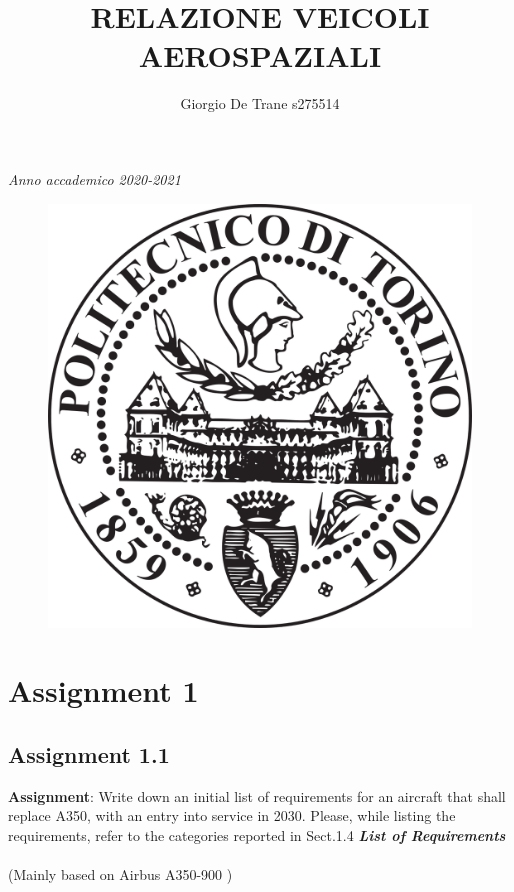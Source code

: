 \documentclass{article}
\author{Giorgio De Trane s275514}
\title{\textbf{RELAZIONE VEICOLI AEROSPAZIALI}}
\begin{document}
\setlength{\parindent}{0pt}
\maketitle
\begin{center}
    \textit{Anno accademico 2020-2021}
\end{center}
\begin{figure}[h!]
    \centering
    \includegraphics[width=\textwidth]{Sources/Plots_and_Pictures/polito_logo.png}\\
\end{figure}
\pagebreak
\tableofcontents
\pagebreak
\section{Assignment 1\label{Assignment_1}}
\subsection{Assignment 1.1\label{Assignment_1.1}}

\textbf{Assignment}: Write down an initial list of requirements for an
aircraft that shall replace A350, with an entry into service in 2030.
Please, while listing the requirements, refer to the categories
reported in Sect.1.4
\newline
\newline
\textbf{\textit{List of Requirements}}\\\\ (Mainly based on Airbus A350-900 \autocite{Airbus_A350-900})
\\ 
\end{document}
